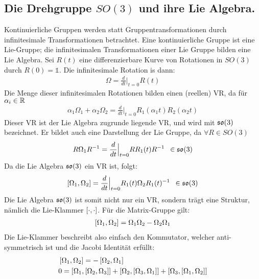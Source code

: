 \subsection{Die Drehgruppe $SO(3)$ und ihre Lie Algebra.}

Kontinuierliche Gruppen werden statt Gruppentransformationen durch infinitesimale
Transformationen betrachtet. Eine kontinuierliche Gruppe ist eine Lie-Gruppe; die
infinitesimalen Transformationen einer Lie Gruppe bilden eine Lie Algebra. Sei
$R(t)$ eine differenzierbare Kurve von Rotationen in $SO(3)$ durch $R(0) = \mathds{1}$.
Die infinitesimale Rotation is dann:
\begin{align*}
    \Omega = \frac{d}{dt} \Big|_{t=0} R(t)
\end{align*}
Die Menge dieser infinitesimalen Rotationen bilden einen (reellen) VR, da
für $\alpha_i \in \mathbb{R}$
\begin{align*}
    \alpha_1 \Omega_1 + \alpha_2 \Omega_2 =
    \frac{d}{dt} \Big|_{t=0} R_1 (\alpha_1 t) R_2 (\alpha_2 t)
\end{align*}
Dieser VR ist der Lie Algebra zugrunde liegende VR, und wird mit $\mathfrak{so}(3)$
bezeichnet. Er bildet auch eine Darstellung der Lie Gruppe, da $\forall R \in SO(3)$
\begin{align*}
    R \Omega_1 R^{-1} = \frac{d}{dt} \Big|_{t=0} R R_1 (t) R^{-1}
    \hspace{5pt} \in \mathfrak{so}(3)
\end{align*}
Da die Lie Algebra $\mathfrak{so}(3)$ ein VR ist, folgt:
\begin{align*}
    \left[ \Omega_1,\Omega_2 \right] = \frac{d}{dt} \Big|_{t=0}
    R_1 (t) \Omega_2 R_1 (t)^{-1}
    \hspace{5pt} \in \mathfrak{so}(3)
\end{align*}
Die Lie Algebra $\mathfrak{so}(3)$ ist somit nicht nur ein VR, sondern trägt eine Struktur,
nämlich die Lie-Klammer $\left[ \cdot,\cdot \right]$. Für die Matrix-Gruppe gilt:
\begin{align*}
    \left[ \Omega_1,\Omega_2 \right] = \Omega_1 \Omega_2 - \Omega_2 \Omega_1
\end{align*}
Die Lie-Klammer beschreibt also einfach den Kommutator, welcher anti-symmetrisch
ist und die Jacobi Identität erfüllt:
\begin{align*}
    &\left[ \Omega_1,\Omega_2 \right] = - \left[ \Omega_2,\Omega_1 \right]
    \\
    &0 =
    \left[ \Omega_1,\left[ \Omega_2,\Omega_3 \right] \right] +
    \left[ \Omega_2,\left[ \Omega_3,\Omega_1 \right] \right] +
    \left[ \Omega_3,\left[ \Omega_1,\Omega_2 \right] \right]
\end{align*}
